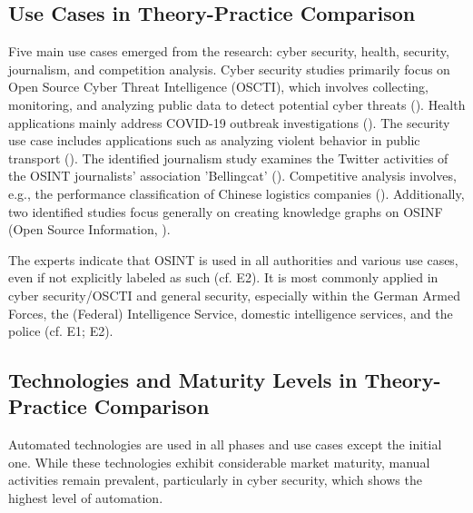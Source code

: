 \documentclass[10pt]{article}
\begin{document}
\subsection{Use Cases in Theory-Practice Comparison}

Five main use cases emerged from the research: cyber security, health, security, journalism,
and competition analysis. Cyber security studies primarily focus on Open Source Cyber Threat
Intelligence (OSCTI), which involves collecting, monitoring, and analyzing public
data to detect potential cyber threats (\cite{Ahuja.2022}).
Health applications mainly address COVID-19 outbreak investigations (\cite{Kpozehouen.2020}).
The security use case includes applications such as
analyzing violent behavior in public transport (\cite{Nobili.2021}). The identified journalism study examines the
Twitter activities of the OSINT journalists' association 'Bellingcat' (\cite{Bar.2023}). Competitive analysis
involves, e.g., the performance classification of Chinese logistics companies (\cite{Tao.2023}).
Additionally, two identified studies focus generally on creating knowledge graphs on OSINF (Open Source Information, \cite{Hu.2023, Ma.2022}).

The experts indicate that OSINT is used in all authorities and various use cases, even if not explicitly labeled as such (cf. E2). It is most commonly applied in cyber security/OSCTI and general security, especially within the German Armed Forces, the (Federal) Intelligence Service, domestic intelligence services, and the police (cf. E1; E2).

\subsection{Technologies and Maturity Levels in Theory-Practice Comparison} \label{sec:matcomp}

Automated technologies are used in all phases and use cases except the initial one. While these technologies exhibit considerable market maturity, manual activities remain prevalent, particularly in cyber security, which shows the highest level of automation.
\end{document}
